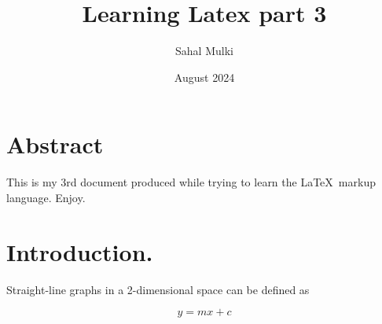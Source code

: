 \documentclass[twocolumn]{article}
\title{Learning Latex part 3}
\author{Sahal Mulki}
\date{August 2024}
\begin{document}
\maketitle

\section{Abstract}

This is my 3rd document produced while trying to learn the \LaTeX \ markup language. Enjoy.

\newpage 

\section{Introduction.}

\lipsum[1-3]
\smallskip

Straight-line graphs in a 2-dimensional space can be defined as 

\textbf{$$y = mx + c$$}
\end{document}
